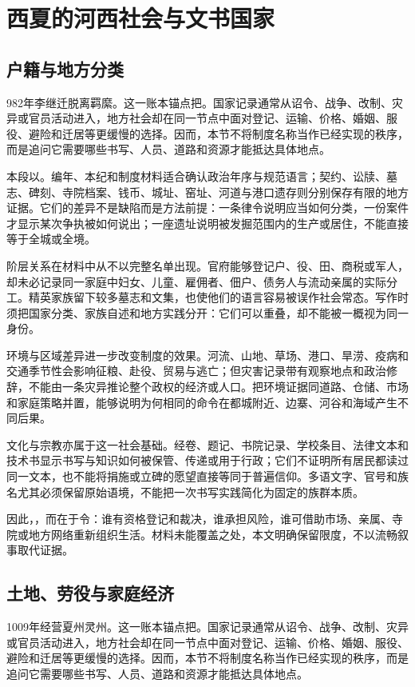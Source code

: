 \section{西夏的河西社会与文书国家}

\subsection{户籍与地方分类}

982年李继迁脱离羁縻。这一账本锚点把。国家记录通常从诏令、战争、改制、灾异或官员活动进入，地方社会却在同一节点中面对登记、运输、价格、婚姻、服役、避险和迁居等更缓慢的选择。因而，本节不将制度名称当作已经实现的秩序，而是追问它需要哪些书写、人员、道路和资源才能抵达具体地点。

本段以。编年、本纪和制度材料适合确认政治年序与规范语言；契约、讼牍、墓志、碑刻、寺院档案、钱币、城址、窑址、河道与港口遗存则分别保存有限的地方证据。它们的差异不是缺陷而是方法前提：一条律令说明应当如何分类，一份案件才显示某次争执被如何说出；一座遗址说明被发掘范围内的生产或居住，不能直接等于全城或全境。

阶层关系在材料中从不以完整名单出现。官府能够登记户、役、田、商税或军人，却未必记录同一家庭中妇女、儿童、雇佣者、佃户、债务人与流动亲属的实际分工。精英家族留下较多墓志和文集，也使他们的语言容易被误作社会常态。写作时须把国家分类、家族自述和地方实践分开：它们可以重叠，却不能被一概视为同一身份。

环境与区域差异进一步改变制度的效果。河流、山地、草场、港口、旱涝、疫病和交通季节性会影响征粮、赴役、贸易与逃亡；但灾害记录带有观察地点和政治修辞，不能由一条灾异推论整个政权的经济或人口。把环境证据同道路、仓储、市场和家庭策略并置，能够说明为何相同的命令在都城附近、边寨、河谷和海域产生不同后果。

文化与宗教亦属于这一社会基础。经卷、题记、书院记录、学校条目、法律文本和技术书显示书写与知识如何被保管、传递或用于行政；它们不证明所有居民都读过同一文本，也不能将捐施或立碑的愿望直接等同于普遍信仰。多语文字、官号和族名尤其必须保留原始语境，不能把一次书写实践简化为固定的族群本质。

因此，，而在于令：谁有资格登记和裁决，谁承担风险，谁可借助市场、亲属、寺院或地方网络重新组织生活。材料未能覆盖之处，本文明确保留限度，不以流畅叙事取代证据。

\subsection{土地、劳役与家庭经济}

1009年经营夏州灵州。这一账本锚点把。国家记录通常从诏令、战争、改制、灾异或官员活动进入，地方社会却在同一节点中面对登记、运输、价格、婚姻、服役、避险和迁居等更缓慢的选择。因而，本节不将制度名称当作已经实现的秩序，而是追问它需要哪些书写、人员、道路和资源才能抵达具体地点。


